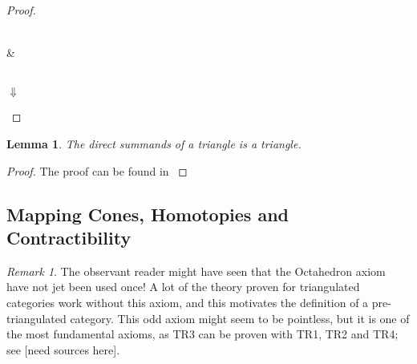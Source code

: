 \documentclass[11pt]{article}
\newtheorem{lemma}[theorem]{Lemma}
\theoremstyle{definition}
\theoremstyle{remark}
\newtheorem*{remark}{Remark}
\begin{document}
\begin{proof}
                \begin{center}
                     \\
                    \& \\
                     \\
                    $\Downarrow$ \\
                \end{center}
            \end{proof}

            \begin{lemma}
                The direct summands of a triangle is a triangle.
            \end{lemma}

            \begin{proof}
                The proof can be found in \cite{neeman}
            \end{proof}
            
            \subsection{Mapping Cones, Homotopies and Contractibility}
            \begin{remark}
                The observant reader might have seen that the Octahedron axiom have not jet been used once! A lot of the theory proven for triangulated categories work without this axiom, and this motivates the definition of a pre-triangulated category. This odd axiom might seem to be pointless, but it is one of the most fundamental axioms, as TR3 can be proven with TR1, TR2 and TR4; see [need sources here].
            \end{remark}
\end{document}
